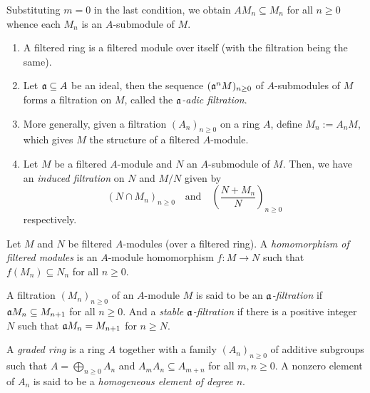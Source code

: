 Substituting $m = 0$ in the last condition, we obtain $AM_n\subseteq M_n$ for all $n\ge 0$ whence each $M_n$ is an $A$-submodule of $M$.

\begin{example}
\begin{enumerate}[label=(\alph*)]
    \item A filtered ring is a filtered module over itself (with the filtration being the same).
    \item Let $\mathfrak a\subseteq A$ be an ideal, then the sequence $(\mathfrak a^nM)_{n\ge 0}$ of $A$-submodules of $M$ forms a filtration on $M$, called the \emph{$\mathfrak a$-adic filtration}.
    \item More generally, given a filtration $(A_n)_{n\ge 0}$ on a ring $A$, define $M_n := A_nM$, which gives $M$ the structure of a filtered $A$-module.
    \item Let $M$ be a filtered $A$-module and $N$ an $A$-submodule of $M$. Then, we have an \emph{induced filtration} on $N$ and $M/N$ given by 
    \begin{equation*}
        (N\cap M_n)_{n\ge 0}\quad\text{and}\quad\left(\frac{N + M_n}{N}\right)_{n\ge 0}
    \end{equation*}
    respectively.
\end{enumerate}
\end{example}

\begin{definition}
    Let $M$ and $N$ be filtered $A$-modules (over a filtered ring). A \emph{homomorphism of filtered modules} is an $A$-module homomorphism $f: M\to N$ such that $f(M_n)\subseteq N_n$ for all $n\ge 0$.
\end{definition}

\begin{definition}
    A filtration $(M_n)_{n\ge 0}$ of an $A$-module $M$ is said to be an \emph{$\mathfrak a$-filtration} if $\mathfrak a M_n\subseteq M_{n + 1}$ for all $n\ge 0$. And a \emph{stable $\mathfrak a$-filtration} if there is a positive integer $N$ such that $\mathfrak a M_n = M_{n + 1}$ for $n\ge N$.
\end{definition}

\begin{definition}
    A \emph{graded ring} is a ring $A$ together with a family $(A_n)_{n\ge 0}$ of additive subgroups such that $A = \bigoplus_{n\ge 0} A_n$ and $A_mA_n\subseteq A_{m + n}$ for all $m,n\ge 0$. A nonzero element of $A_n$ is said to be a \emph{homogeneous element of degree $n$}.
\end{definition}

